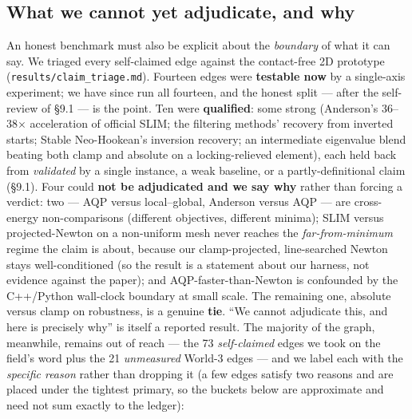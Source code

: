 \documentclass{egpubl}
\begin{document}
\subsection{What we cannot yet adjudicate, and why}

An honest benchmark must also be explicit about the \emph{boundary} of what it can say. We triaged every
self-claimed edge against the contact-free 2D prototype (\texttt{results/claim\_triage.md}). Fourteen edges
were \textbf{testable now} by a single-axis experiment; we have since run all fourteen, and the honest
split --- after the self-review of \S9.1 --- is the point. Ten were \textbf{qualified}: some strong (Anderson's
36--38$\times$ acceleration of official SLIM; the filtering methods' recovery from inverted starts; Stable
Neo-Hookean's inversion recovery; an intermediate eigenvalue blend beating both clamp and absolute on
a locking-relieved element), each held back from \emph{validated} by a single instance, a weak baseline, or
a partly-definitional claim (\S9.1). Four could \textbf{not be adjudicated and we say why} rather than
forcing a verdict: two --- AQP versus local--global, Anderson versus AQP --- are cross-energy
non-comparisons (different objectives, different minima); SLIM versus projected-Newton on a
non-uniform mesh never reaches the \emph{far-from-minimum} regime the claim is about, because our
clamp-projected, line-searched Newton stays well-conditioned (so the result is a statement about our
harness, not evidence against the paper); and AQP-faster-than-Newton is confounded by the C++/Python
wall-clock boundary at small scale. The remaining one, absolute versus clamp on robustness, is a genuine
\textbf{tie}. ``We cannot adjudicate this, and here is precisely why'' is itself a reported result. The
majority of the graph, meanwhile, remains out of reach --- the 73 \emph{self-claimed} edges we took on the
field's word plus the 21 \emph{unmeasured} World-3 edges --- and we label each with the \emph{specific reason}
rather than dropping it (a few edges satisfy two reasons and are placed under the tightest primary, so
the buckets below are approximate and need not sum exactly to the ledger):
\end{document}
